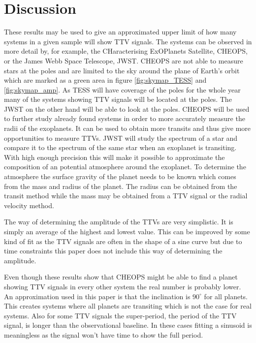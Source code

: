 \documentclass[12pt]{report}
\begin{document}
\chapter{Discussion}
	These results may be used to give an approximated upper limit of how many systems in a given sample will show TTV signals. The systems can be observed in more detail by, for example, the CHaracterising ExOPlanets Satellite, CHEOPS, or the James Webb Space Telescope, JWST. CHEOPS are not able to measure stars at the poles and are limited to the sky around the plane of Earth's orbit which are marked as a green area in figure \ref{fig:skymap_TESS} and \ref{fig:skymap_amp}. As TESS will have coverage of the poles for the whole year many of the systems showing TTV signals will be located at the poles. The JWST on the other hand will be able to look at the poles. CHEOPS will be used to further study already found systems in order to more accurately measure the radii of the exoplanets. It can be used to obtain more transits and thus give more opportunities to measure TTVs. JWST will study the spectrum of a star and compare it to the spectrum of the same star when an exoplanet is transiting. With high enough precision this will make it possible to approximate the composition of an potential atmosphere around the exoplanet. To determine the atmosphere the surface gravity of the planet needs to be known which comes from the mass and radius of the planet. The radius can be obtained from the transit method while the mass may be obtained from a TTV signal or the radial velocity method.
	
	The way of determining the amplitude of the TTVs are very simplistic. It is simply an average of the highest and lowest value. This can be improved by some kind of fit as the TTV signals are often in the shape of a sine curve but due to time constraints this paper does not include this way of determining the amplitude.
	
	Even though these results show that CHEOPS might be able to find a planet showing TTV signals in every other system the real number is probably lower. An approximation used in this paper is that the inclination is $90^{\circ}$ for all planets. This creates systems where all planets are transiting which is not the case for real systems. Also for some TTV signals the super-period, the period of the TTV signal, is longer than the observational baseline. In these cases fitting a sinusoid is meaningless as the signal won't have time to show the full period. 
	
\end{document}
